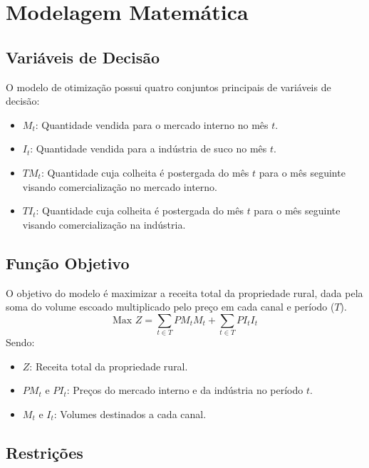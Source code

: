 \documentclass[12pt, a4paper]{article}
\begin{document}
\section{Modelagem Matemática}

\subsection{Variáveis de Decisão}
O modelo de otimização possui quatro conjuntos principais de variáveis de decisão:
\begin{itemize}
    \item $M_t$: Quantidade vendida para o mercado interno no mês $t$.
    \item $I_t$: Quantidade vendida para a indústria de suco no mês $t$.
    \item $TM_t$: Quantidade cuja colheita é postergada do mês $t$ para o mês seguinte visando comercialização no mercado interno.
    \item $TI_t$: Quantidade cuja colheita é postergada do mês $t$ para o mês seguinte visando comercialização na indústria.
\end{itemize}

\subsection{Função Objetivo}
O objetivo do modelo é maximizar a receita total da propriedade rural, dada pela soma do volume escoado multiplicado pelo preço em cada canal e período ($T$).
\begin{equation*}
\text{Max } Z = \sum_{t \in T} PM_t M_t + \sum_{t \in T} PI_t I_t
\end{equation*}
Sendo:
\begin{itemize}
    \item $Z$: Receita total da propriedade rural.
    \item $PM_t$ e $PI_t$: Preços do mercado interno e da indústria no período $t$.
    \item $M_t$ e $I_t$: Volumes destinados a cada canal.
\end{itemize}

\subsection{Restrições}
\end{document}
